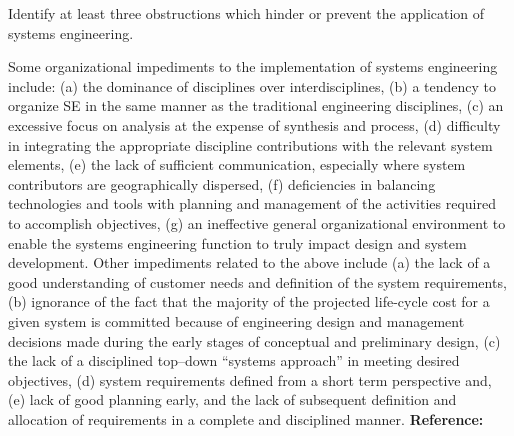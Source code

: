 \begin{exercises}
    \begin{exercise}
    \label{sea-02-23}
        Identify at least three obstructions which hinder or prevent the application of systems engineering.
    \end{exercise}
    \begin{solution}
        Some organizational impediments to the implementation of systems engineering include: (a) the dominance of disciplines over interdisciplines, (b) a tendency to organize SE in the same manner as the traditional engineering disciplines, (c) an excessive focus on analysis at the expense of synthesis and process, (d) difficulty in integrating the appropriate discipline contributions with the relevant system elements, (e) the lack of sufficient communication, especially where system contributors are geographically dispersed, (f) deficiencies in balancing technologies and tools with planning and management of the activities required to accomplish objectives, (g) an ineffective general organizational environment to enable the systems engineering function to truly impact design and system development. Other impediments related to the above include (a) the lack of a good understanding of customer needs and definition of the system requirements, (b) ignorance of the fact that the majority of the projected life-cycle cost for a given system is committed because of engineering design and management decisions made during the early stages of conceptual and preliminary design, (c) the lack of a disciplined top–down “systems approach” in meeting desired objectives, (d) system requirements defined from a short term perspective and, (e) lack of good planning early, and the lack of subsequent definition and allocation of requirements in a complete and disciplined manner. \textbf{Reference:}
    \end{solution}
    

\end{exercises}
